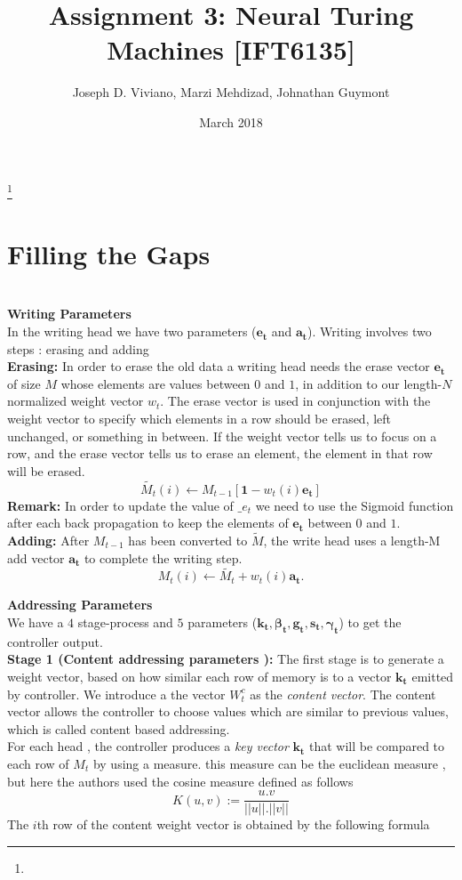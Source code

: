 \documentclass{amsart}
\numberwithin{equation}{section}
\theoremstyle{definition}
\theoremstyle{remark}
\begin{document}
\title{Assignment 3: Neural Turing Machines [IFT6135]}

\author{Joseph D. Viviano, Marzi Mehdizad, Johnathan Guymont}
\address{Universit\'e de Montr\'eal}
\curraddr{}
\thanks{}
\date{March 2018}

\maketitle

\section{Filling the Gaps} \\

\textbf{Writing Parameters}\\
In the writing head we have two parameters ($\bm{e_t}$ and $\bm{a_t}$). Writing involves two steps : erasing and adding\\
\textbf{Erasing:} In order to erase the old data a writing head needs  the erase vector $\bm{e_t}$ of size $M$ whose elements are values between $0$ and $1$, in addition to our length-$N$ normalized weight vector $w_t$. The erase vector is used in conjunction with the weight vector to specify which elements in a row should be erased, left unchanged, or something in between. If the weight vector tells us to focus on a row, and the erase vector tells us to erase an element, the element in that row will be erased.
$$\tilde{M_t}(i)\leftarrow M_{t-1}\left[\bm{1}-w_t(i)\bm{e_t}\right]$$
\textbf{Remark:} In order to update the value of $\bm_{e_t}$ we need to use the Sigmoid function after each back propagation to keep the elements of $\bm{e_t}$ between $0$ and $1$.\\
\textbf{Adding:} After $M_{t−1}$ has been converted to $\tilde{M}$, the write head uses a length-{M} add vector $\bm{a_t}$ to complete the writing step.
$$M_t(i)\leftarrow \tilde{M_t}+w_t(i)\bm{a_t}.$$



\textbf{Addressing Parameters}\\
We have a $4$ stage-process and $5$  parameters ($\bm{k_t},\bm{\beta_t}, \bm{g_t}, \bm{s_t}, \bm{\gamma_t}$) to get the controller output. \\
\textbf{Stage 1 (Content addressing parameters ):} The first stage is to generate a weight vector, based on how similar each row of memory is to a vector $\bm{k_t}$ emitted by controller. We introduce a the vector $W_t^c$ as the \textit{content vector}. The content vector allows the controller to choose values which are similar to previous values, which is called content based addressing.\\
For each head , the controller produces a \textit{key vector} $\bm{k_t}$ that will be compared to each row of $M_t$ by using a measure. this measure can be the euclidean measure , but here the authors used the cosine measure defined as follows
$$K(u,v):= \frac{u.v}{||u||.||v||}$$
The $i$th row of the content weight vector is obtained by the following formula
\end{document}
